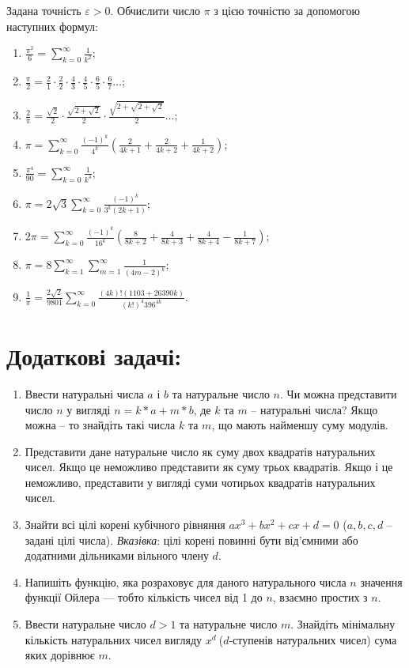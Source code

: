 \documentclass[a5paper,titlepage,openany,twoside,
]
{book_unv}%
\makeatletter
\newcommand{\xslalph}[1]{\expandafter\@xslalph\csname c@#1\endcsname}
\newcommand{\@xslalph}[1]{%
    \ifcase#1\or а\or б\or в\or г\or д\or e\or є\or ж\or з\or i%
    \or й\or к\or л\or м\or н\or о\or п\or р\or с\or т%
    \or у\or ф\or х\or ц\or ч\or ш\or ю\or я\or аа\or бб\or вв%
    \else\@ctrerr\fi%
}
\makeatother
\begin{document}
\begin{enumerate}
 Задана точність $\varepsilon>0$. Обчислити число $\pi$ 
з цією точністю за допомогою наступних формул:
  \begin{enumerate}[label=\xslalph*)]
\item
 $ \frac{\pi^2}{6} = \sum\limits_{k=0}^{\infty} \frac{1}{k^2} $;
\item
 $\frac{\pi}{2} = \frac{2}{1} \cdot \frac{2}{2} \cdot \frac{4}{3} \cdot \frac{4}{5} \cdot \frac{6}{5}\cdot \frac{6}{7} \ldots $;
\item
$\frac{2}{\pi} = \frac{\sqrt{2}}{2} \cdot \frac{\sqrt{2 + \sqrt{2}}}{2} \cdot \frac{\sqrt{2 + \sqrt{2+\sqrt{2}}}}{2} \ldots $;
\item
$\pi = \sum\limits_{k=0}^{\infty} \frac{(-1)^{k}}{4^{k}}\left( \frac{2}{4k+1} + \frac{2}{4k+2} + \frac{1}{4k+2}\right)$;
\item
 $ \frac{\pi^4}{90} = \sum\limits_{k=0}^{\infty} \frac{1}{k^4} $;
\item
 $ \pi = 2\sqrt{3} \sum\limits_{k=0}^{\infty} \frac{(-1)^{k}}{3^{k}(2k+1)} $;
\item
$ 2\pi = \sum\limits_{k=0}^{\infty} \frac{(-1)^{k}}{16^{k}}\left( \frac{8}{8k+2} + \frac{4}{8k+3} + \frac{4}{8k+4}  - \frac{1}{8k+7}\right)$;
\item
$ \pi = 8 \sum\limits_{k=1}^{\infty} \sum\limits_{m=1}^{\infty} \frac{1}{(4m-2)^{k}} $;
\item
$ \frac{1}{\pi} = \frac{2 \sqrt{2}}{9801} \sum\limits_{k=0}^{\infty}  \frac{(4k)!(1103 +26390k)}{(k!)^{4}396^{4k}} $.

  \end{enumerate}
\end{enumerate}
 \section{Додаткові задачі:}

\begin{enumerate}
\def\labelenumi{\arabic{enumi})}
\setcounter{enumi}{26}
\item
  Ввести натуральні числа $a$ і $b$ та натуральне число $n$. Чи можна
  представити число $n$ у вигляді $n= k*a + m*b$, де $k$ та $m$ -- натуральні
  числа? Якщо можна -- то знайдіть такі числа $k$ та $m$, що мають найменшу
  суму модулів.
\item
  Представити дане натуральне число як суму двох квадратів натуральних
  чисел. Якщо це неможливо представити як суму трьох квадратів. Якщо і
  це неможливо, представити у вигляді суми чотирьох квадратів
  натуральних чисел.
\item
  Знайти всі цілі корені кубічного рівняння $ax^3 + bx^2 + cx + d = 0$ ($a,b,c,d$ 
-- задані цілі числа). \emph{Вказівка}: цілі корені повинні бути від'ємними
 або додатними дільниками вільного члену $d$.
\item
  Напишіть функцію, яка розраховує для даного натурального числа $n$
  значення функції Ойлера --- тобто кількість чисел від 1 до $n$, взаємно простих з
  $n$.
\item
  Ввести натуральне число \(d > 1\) та натуральне число $m$. Знайдіть
  мінімальну кількість натуральних чисел вигляду \(x^{d}\ \)(\(d\)-ступенів
  натуральних чисел) сума яких дорівнює $m$.
\end{enumerate}
\end{document}
